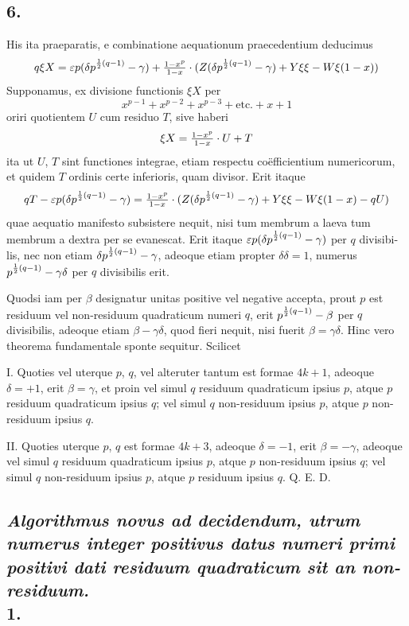 \documentclass[twoside,12pt, showframe]{memoir}
\let\oldfrac\frac
\def\frac#1#2{\mathchoice{\tfrac{#1}{#2}}{\oldfrac{#1}{#2}}{\genfrac{}{}{}{2}{#1}{#2\mathstrut}}{\genfrac{}{}{}{3}{#1}{#2\mathstrut}}}
\begin{document}
\subsection*{6.}
 
His ita praeparatis, e combinatione aequationum praecedentium deducimus
\[q \xi {X}=\varepsilon p(\delta p^{\frac{1}{2}(q-1)}-\gamma)+\frac{1-x^{p}}{1-x} \cdot(Z(\delta p^{\frac{1}{2}(q-1)}-\gamma)+Y \xi \xi-W \xi(1-x))\]
Supponamus, ex divisione functionis \(\xi X\) per
\[x^{p-1}+x^{p-2}+x^{p-3}+\text{etc.}+x+1\]
oriri quotientem \(U\) cum residuo \(T\), sive haberi
\[\xi X=\frac{1-x^{p}}{1-x} \cdot U+T\]
ita ut \(U\), \(T\) sint functiones integrae, etiam respectu coëfficientium numericorum, et quidem \(T\) ordinis certe inferioris, quam divisor. Erit itaque
\[q T-\varepsilon p(\delta p^{\frac{1}{2}(q-1)}-\gamma)=\frac{1-x^{p}}{1-x} \cdot(Z(\delta p^{\frac{1}{2}(q-1)}-\gamma)+Y \xi \xi-W \xi(1-x)-q U)\]
quae aequatio manifesto subsistere nequit, nisi tum membrum a laeva tum membrum a dextra per se evanescat. Erit itaque \(\varepsilon p(\delta p^{\frac{1}{2}(q-1)}-\gamma)\) per \(q\) divisibi-\clearpage\noindent%
lis, nec non etiam \(\delta p^{\frac{1}{2}(q-1)}-\gamma\), adeoque etiam propter \(\delta \delta=1\), numerus \(p^{\frac{1}{2}(q-1)}-\gamma \delta\) per \(q\) divisibilis erit.

Quodsi iam per \(\beta\) designatur unitas positive vel negative accepta, prout \(p\) est residuum vel non-residuum quadraticum numeri \(q\), erit \(p^{\frac{1}{2}(q-1)}-\beta\) per \(q\) divisibilis, adeoque etiam \(\beta-\gamma \delta\), quod fieri nequit, nisi fuerit \(\beta=\gamma \delta\). Hinc vero theorema fundamentale sponte sequitur. Scilicet
 
I. Quoties vel uterque \(p\), \(q\), vel alteruter tantum est formae \(4 k+1\), adeoque \(\delta=+1\), erit \(\beta=\gamma\), et proin vel simul \(q\) residuum quadraticum ipsius \(p\), atque \(p\) residuum quadraticum ipsius \(q\); vel simul \(q\) non-residuum ipsius \(p\), atque \(p\) non-residuum ipsius \(q\).
 
II. Quoties uterque \(p\), \(q\) est formae \(4 k+3\), adeoque \(\delta=-1\), erit \(\beta=-\gamma\), adeoque vel simul \(q\) residuum quadraticum ipsius \(p\), atque \(p\) non-residuum ipsius \(q\); vel simul \(q\) non-residuum ipsius \(p\), atque \(p\) residuum ipsius \(q\). Q. E. D.

\subsection*{{\scriptsize \textit{Algorithmus novus ad decidendum, utrum numerus integer positivus datus numeri primi positivi dati residuum quadraticum sit an non-residuum.}}\\
1.}
 
\end{document}
